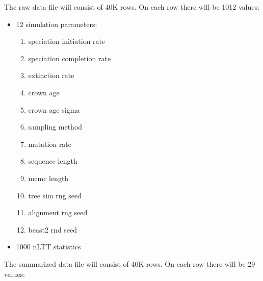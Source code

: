 \documentclass{article}
\begin{document}
The raw data file will consist of 40K rows. On each row there will be 1012 values:

\begin{itemize}  
  \item 12 simulation parameters:
  \begin{enumerate}  
    \item speciation initiation rate
    \item speciation completion rate
    \item extinction rate
    \item crown age
    \item crown age sigma
    \item sampling method
    \item mutation rate
    \item sequence length
    \item mcmc length
    \item tree sim rng seed
    \item alignment rng seed
    \item beast2 rnd seed
  \end{enumerate}
  \item 1000 nLTT statistics
\end{itemize}

The summarized data file will consist of 40K rows. On each row there will be 29 values:
\end{document}
